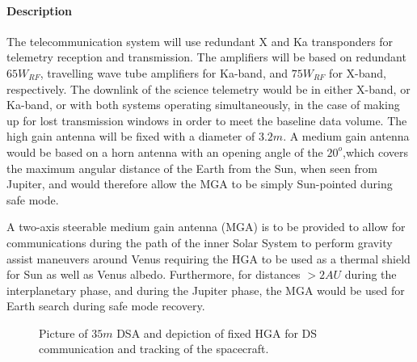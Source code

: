 \paragraph{Description}
The telecommunication system will use redundant X and Ka transponders for telemetry reception and transmission. The amplifiers will be based on redundant $65W_{RF}$, travelling wave tube amplifiers for Ka-band, and $75W_{RF}$ for X-band, respectively. The downlink of the science telemetry would be in either X-band, or Ka-band, or with both systems operating simultaneously, in the case of making up for lost transmission windows in order to meet the baseline data volume. The high gain antenna will be fixed with a diameter of $3.2m$. A medium gain antenna would be based on a horn antenna with an opening angle of the $20^o$,which covers the maximum angular distance of the Earth from the Sun, when seen from Jupiter, and would therefore allow the MGA to be simply Sun-pointed during safe mode.

A two-axis steerable medium gain antenna (MGA) is to be provided to allow for communications during the path of the inner Solar System to perform gravity assist maneuvers around Venus requiring the HGA to be used as a thermal shield for Sun as well as Venus albedo. Furthermore, for distances $>2AU$ during the interplanetary phase, and during the Jupiter phase, the MGA would be used for Earth search during safe mode recovery.

\begin{figure}[htb]
	\centering
	\caption{Picture of $35m$ DSA and depiction of fixed HGA for DS communication and tracking of the spacecraft.}
	\label{fig:DS-a}
\end{figure}

